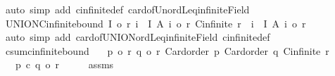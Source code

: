 \begin{isabellebody}
%
\isadelimproof
%
\endisadelimproof
%
\isatagproof
{}\isamarkupfalse%
\ {\isacharparenleft}{\kern0pt}auto\ simp\ add{\isacharcolon}{\kern0pt}\ cinfinite{\isacharunderscore}{\kern0pt}def\ card{\isacharunderscore}{\kern0pt}of{\isacharunderscore}{\kern0pt}Un{\isacharunderscore}{\kern0pt}ordLeq{\isacharunderscore}{\kern0pt}infinite{\isacharunderscore}{\kern0pt}Field{\isacharparenright}{\kern0pt}%
\endisatagproof
{\isafoldproof}%
%
\isadelimproof
\isanewline
%
\endisadelimproof
\isanewline
{}\isamarkupfalse%
\ UNION{\isacharunderscore}{\kern0pt}Cinfinite{\isacharunderscore}{\kern0pt}bound{\isacharcolon}{\kern0pt}\ {\isachardoublequoteopen}{\isasymlbrakk}{\isacharbar}{\kern0pt}I{\isacharbar}{\kern0pt}\ {\isasymle}o\ r{\isacharsemicolon}{\kern0pt}\ {\isasymforall}i\ {\isasymin}\ I{\isachardot}{\kern0pt}\ {\isacharbar}{\kern0pt}A\ i{\isacharbar}{\kern0pt}\ {\isasymle}o\ r{\isacharsemicolon}{\kern0pt}\ Cinfinite\ r{\isasymrbrakk}\ {\isasymLongrightarrow}\ {\isacharbar}{\kern0pt}{\isasymUnion}i\ {\isasymin}\ I{\isachardot}{\kern0pt}\ A\ i{\isacharbar}{\kern0pt}\ {\isasymle}o\ r{\isachardoublequoteclose}\isanewline
%
\isadelimproof
%
\endisadelimproof
%
\isatagproof
{}\isamarkupfalse%
\ {\isacharparenleft}{\kern0pt}auto\ simp\ add{\isacharcolon}{\kern0pt}\ card{\isacharunderscore}{\kern0pt}of{\isacharunderscore}{\kern0pt}UNION{\isacharunderscore}{\kern0pt}ordLeq{\isacharunderscore}{\kern0pt}infinite{\isacharunderscore}{\kern0pt}Field\ cinfinite{\isacharunderscore}{\kern0pt}def{\isacharparenright}{\kern0pt}%
\endisatagproof
{\isafoldproof}%
%
\isadelimproof
\isanewline
%
\endisadelimproof
\isanewline
{}\isamarkupfalse%
\ csum{\isacharunderscore}{\kern0pt}cinfinite{\isacharunderscore}{\kern0pt}bound{\isacharcolon}{\kern0pt}\isanewline
\ \ \ {\isachardoublequoteopen}p\ {\isasymle}o\ r{\isachardoublequoteclose}\ {\isachardoublequoteopen}q\ {\isasymle}o\ r{\isachardoublequoteclose}\ {\isachardoublequoteopen}Card{\isacharunderscore}{\kern0pt}order\ p{\isachardoublequoteclose}\ {\isachardoublequoteopen}Card{\isacharunderscore}{\kern0pt}order\ q{\isachardoublequoteclose}\ {\isachardoublequoteopen}Cinfinite\ r{\isachardoublequoteclose}\isanewline
\ \ \ {\isachardoublequoteopen}p\ {\isacharplus}{\kern0pt}c\ q\ {\isasymle}o\ r{\isachardoublequoteclose}\isanewline
%
\isadelimproof
%
\endisadelimproof
%
\isatagproof
{}\isamarkupfalse%
\ {\isacharminus}{\kern0pt}\isanewline
\ \ \isamarkupfalse%
\ assms{\isacharparenleft}{\kern0pt}{}{\isacharminus}{\kern0pt}{}{\isacharparenright}{\kern0pt}\ \isamarkupfalse%

\end{isabellebody}
